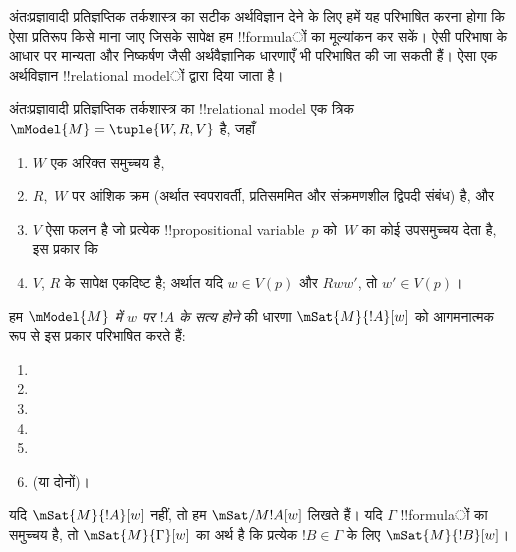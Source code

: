 \documentclass[../../../include/open-logic-section]{subfiles}
\begin{document}


अंतःप्रज्ञावादी प्रतिज्ञप्तिक तर्कशास्त्र का सटीक अर्थविज्ञान देने के लिए
हमें यह परिभाषित करना होगा कि ऐसा प्रतिरूप किसे माना जाए जिसके सापेक्ष हम
!!{formula}ों का मूल्यांकन कर सकें। ऐसी परिभाषा के आधार पर मान्यता और
निष्कर्षण जैसी अर्थवैज्ञानिक धारणाएँ भी परिभाषित की जा सकती हैं। ऐसा एक
अर्थविज्ञान !!{relational model}ों द्वारा दिया जाता है।

\begin{defn}
  अंतःप्रज्ञावादी प्रतिज्ञप्तिक तर्कशास्त्र का !!{relational model} एक
  त्रिक $\mModel{M} = \tuple{W, R, V}$ है, जहाँ
  \begin{enumerate}
  \item $W$ एक अरिक्त समुच्चय है,
  \item $R$,~$W$ पर आंशिक क्रम (अर्थात स्वपरावर्ती, प्रतिसममित और
    संक्रमणशील द्विपदी संबंध) है, और
  \item $V$ ऐसा फलन है जो प्रत्येक !!{propositional variable}~$p$ को~$W$ का कोई
    उपसमुच्चय देता है, इस प्रकार कि
  \item $V$, $R$ के सापेक्ष एकदिष्ट है; अर्थात यदि $w \in V(p)$ और $Rww'$,
    तो $w' \in V(p)$।
  \end{enumerate}
\end{defn}

\begin{defn}
  हम \emph{$\mModel{M}$ में $w$ पर $!A$ के सत्य होने} की धारणा
  $\mSat{M}{!A}[w]$ को आगमनात्मक रूप से इस प्रकार परिभाषित करते हैं:
  \begin{enumerate}
  \item {}
  \item {}
  \item {}
  \item {}
  \item {}
  \item {} (या दोनों)।
  \end{enumerate}
  यदि $\mSat{M}{!A}[w]$ नहीं, तो हम $\mSat/{M}{!A}[w]$ लिखते हैं। यदि
  $\Gamma$ !!{formula}ों का समुच्चय है, तो $\mSat{M}{\Gamma}[w]$ का अर्थ है
  कि प्रत्येक $!B \in \Gamma$ के लिए $\mSat{M}{!B}[w]$।
\end{defn}
\end{document}

